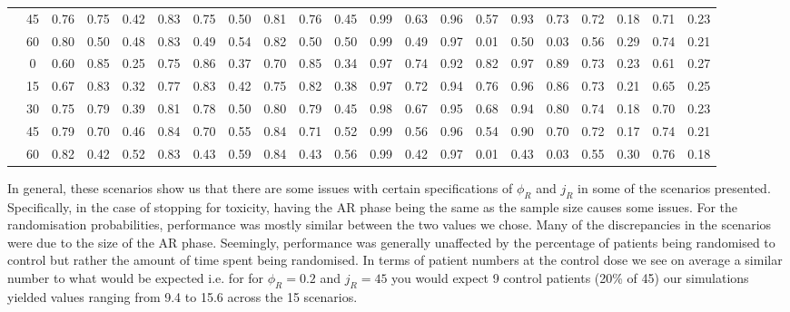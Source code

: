 \begin{table}[h!]
{\begin{tabular}[t]{ccccccccccccccccccccc}
			\hspace{1em} & 45 & 0.76 & 0.75 & 0.42 & 0.83 & 0.75 & 0.50 & 0.81 & 0.76 & 0.45 & 0.99 & 0.63 & 0.96 & 0.57 & 0.93 & 0.73 & 0.72 & 0.18 & 0.71 & 0.23\\
			
			\hspace{1em}\multirow{-5}{*}{\centering\arraybackslash 0.20} & 60 & 0.80 & 0.50 & 0.48 & 0.83 & 0.49 & 0.54 & 0.82 & 0.50 & 0.50 & 0.99 & 0.49 & 0.97 & 0.01 & 0.50 & 0.03 & 0.56 & 0.29 & 0.74 & 0.21\\
			\cmidrule{1-21}
			& 0 & 0.60 & 0.85 & 0.25 & 0.75 & 0.86 & 0.37 & 0.70 & 0.85 & 0.34 & 0.97 & 0.74 & 0.92 & 0.82 & 0.97 & 0.89 & 0.73 & 0.23 & 0.61 & 0.27\\
			
			\hspace{1em} & 15 & 0.67 & 0.83 & 0.32 & 0.77 & 0.83 & 0.42 & 0.75 & 0.82 & 0.38 & 0.97 & 0.72 & 0.94 & 0.76 & 0.96 & 0.86 & 0.73 & 0.21 & 0.65 & 0.25\\
			
			\hspace{1em} & 30 & 0.75 & 0.79 & 0.39 & 0.81 & 0.78 & 0.50 & 0.80 & 0.79 & 0.45 & 0.98 & 0.67 & 0.95 & 0.68 & 0.94 & 0.80 & 0.74 & 0.18 & 0.70 & 0.23\\
			
			\hspace{1em} & 45 & 0.79 & 0.70 & 0.46 & 0.84 & 0.70 & 0.55 & 0.84 & 0.71 & 0.52 & 0.99 & 0.56 & 0.96 & 0.54 & 0.90 & 0.70 & 0.72 & 0.17 & 0.74 & 0.21\\
			
			\hspace{1em}\multirow{-5}{*}{\centering\arraybackslash 0.33} & 60 & 0.82 & 0.42 & 0.52 & 0.83 & 0.43 & 0.59 & 0.84 & 0.43 & 0.56 & 0.99 & 0.42 & 0.97 & 0.01 & 0.43 & 0.03 & 0.55 & 0.30 & 0.76 & 0.18\\
			\bottomrule
	\end{tabular}}
\end{table}

In general, these scenarios show us that there are some issues with certain specifications of $\phi_R$ and $j_R$ in some of the scenarios presented. Specifically, in the case of stopping for toxicity, having the AR phase being the same as the sample size causes some issues. For the randomisation probabilities, performance was mostly similar between the two values we chose. Many of the discrepancies in the scenarios were due to the size of the AR phase. Seemingly, performance was generally unaffected by the percentage of patients being randomised to control but rather the amount of time spent being randomised. In terms of patient numbers at the control dose we see on average a similar number to what would be expected i.e. for  for $\phi_R = 0.2$ and  $j_R = 45$ you would expect 9 control patients (20\% of 45) our simulations yielded values ranging from 9.4 to 15.6 across the 15 scenarios. 

